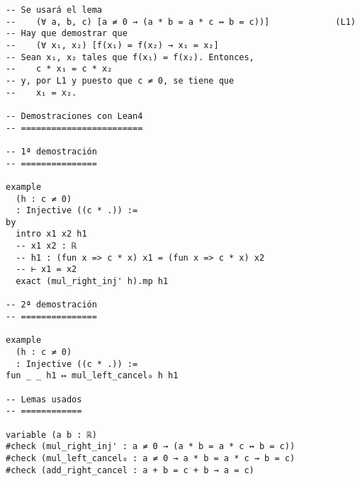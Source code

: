 \begin{verbatim}
-- Se usará el lema
--    (∀ a, b, c) [a ≠ 0 → (a * b = a * c ↔ b = c))]             (L1)
-- Hay que demostrar que
--    (∀ x₁, x₂) [f(x₁) = f(x₂) → x₁ = x₂]
-- Sean x₁, x₂ tales que f(x₁) = f(x₂). Entonces,
--    c * x₁ = c * x₂
-- y, por L1 y puesto que c ≠ 0, se tiene que
--    x₁ = x₂.

-- Demostraciones con Lean4
-- ========================

-- 1ª demostración
-- ===============

example
  (h : c ≠ 0)
  : Injective ((c * .)) :=
by
  intro x1 x2 h1
  -- x1 x2 : ℝ
  -- h1 : (fun x => c * x) x1 = (fun x => c * x) x2
  -- ⊢ x1 = x2
  exact (mul_right_inj' h).mp h1

-- 2ª demostración
-- ===============

example
  (h : c ≠ 0)
  : Injective ((c * .)) :=
fun _ _ h1 ↦ mul_left_cancel₀ h h1

-- Lemas usados
-- ============

variable (a b : ℝ)
#check (mul_right_inj' : a ≠ 0 → (a * b = a * c ↔ b = c))
#check (mul_left_cancel₀ : a ≠ 0 → a * b = a * c → b = c)
#check (add_right_cancel : a + b = c + b → a = c)
\end{verbatim}

